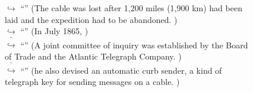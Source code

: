 \documentclass[11pt,a4paper, onecolumn]{article}
\begin{document}
\begin{figure}[t] \small \begin{tcolorbox}[boxsep=0pt,left=5pt,right=0pt,top=2pt,colback = yellow!5] \begin{dialogue}
 \small 
\colorbox{pink!25}{$\hookrightarrow$}
{ ``'' (The cable was lost after 1,200 miles (1,900 km) had been laid and the expedition had to be abandoned. ) }
\\
\colorbox{pink!25}{$\hookrightarrow$}
{ ``'' (In July 1865, ) }
\\
\colorbox{pink!25}{ $\bar{\hookrightarrow}$}
{ ``'' (A joint committee of inquiry was established by the Board of Trade and the Atlantic Telegraph Company. ) }
\\
\colorbox{pink!25}{ $\bar{\hookrightarrow}$}
{ ``'' (he also devised an automatic curb sender, a kind of telegraph key for sending messages on a cable. ) }
\\
 \end{dialogue}\end{tcolorbox}\end{figure}
\end{document}
